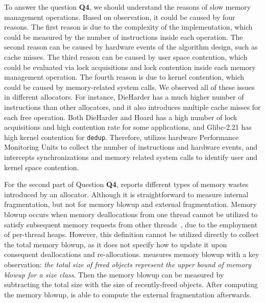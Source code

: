 To answer the question \textbf{Q4}, we should understand the reasons of slow memory management operations. Based on observation, it could be caused by four reasons. The first reason is due to the complexity of the implementation, which could be measured by the number of instructions inside each operation. The second reason can be caused by hardware events of the algorithm design, such as cache misses. The third reason can be caused by user space contention, which could be evaluated via lock acquisitions and lock contention inside each memory management operation. The fourth reason is due to kernel contention, which could be caused by memory-related system calls. 
We observed all of these issues in different allocators. For instance, DieHarder has a much higher number of instructions than other allocators, and it also introduces multiple cache misses for each free operation. Both DieHarder and Hoard has a high number of lock acquisitions and high contention rate for some applications, and Glibc-2.21 has high kernel contention for \texttt{dedup}. Therefore, \MP{} utilizes hardware Performance Monitoring Units to collect the number of instructions and hardware events, and intercepts synchronizations and memory related system calls to identify user and kernel space contention. 

For the second part of Question \textbf{Q4}, \MP{} reports different types of memory wastes introduced by an allocator. Although it is straightforward to measure internal fragmentation, but not for memory blowup and external fragmentation. Memory blowup occurs when memory deallocations from one thread cannot be utilized to satisfy subsequent memory requests from other threads~\cite{Hoard}, due to the employment of per-thread heaps. However, this definition cannot be utilized directly to collect the total memory blowup, as it does not specify how to update it upon consequent deallocations and re-allocations. \MP{} measures memory blowup with a key observation: \textit{the total size of freed objects represent the upper bound of memory blowup for a size class}. Then the memory blowup can be measured by subtracting the total size with the size of recently-freed objects. After computing the memory blowup, \MP{} is able to compute the external fragmentation afterwards. 



 
